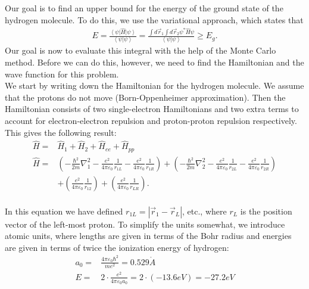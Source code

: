 Our goal is to find an upper bound for the energy of the ground state of the hydrogen molecule. To do this, we use the variational approach, which states that 
\begin{align}
E = \frac{{\left\langle \psi  \right|\hat H\left| \psi  \right\rangle }}{{\left\langle \psi  \right|\left. \psi  \right\rangle }} = \frac{{\int {d{{\vec r}_1}\int {d{{\vec r}_2}} {\psi ^ * }\hat H\psi } }}{{\left\langle \psi  \right|\left. \psi  \right\rangle }} \ge {E_g}.
\end{align}
Our goal is now to evaluate this integral with the help of the Monte Carlo method. Before we can do this, however, we need to find the Hamiltonian and the wave function for this problem.\\

We start by writing down the Hamiltonian for the hydrogen molecule. We assume that the protons do not move (Born-Oppenheimer approximation). Then the Hamiltonian consists of two single-electron Hamiltonians and two extra terms to account for electron-electron repulsion and proton-proton repulsion respectively. This gives the following result:
\begin{align}
\hat H =& {\hat H_1} + {\hat H_2} + {\hat H_{ee}} + {\hat H_{pp}}\\
\hat H =& \left( { - \frac{{{\hbar ^2}}}{{2m}}\nabla _1^2 - \frac{{{e^2}}}{{4\pi {\varepsilon _0}}}\frac{1}{{{r_{1L}}}} - \frac{{{e^2}}}{{4\pi {\varepsilon _0}}}\frac{1}{{{r_{1R}}}}} \right) + \left( { - \frac{{{\hbar ^2}}}{{2m}}\nabla _2^2 - \frac{{{e^2}}}{{4\pi {\varepsilon _0}}}\frac{1}{{{r_{2L}}}} - \frac{{{e^2}}}{{4\pi {\varepsilon _0}}}\frac{1}{{{r_{2R}}}}} \right)\nonumber\\
& + \left( {\frac{{{e^2}}}{{4\pi {\varepsilon _0}}}\frac{1}{{{r_{12}}}}} \right) + \left( {\frac{{{e^2}}}{{4\pi {\varepsilon _0}}}\frac{1}{{{r_{LR}}}}} \right).
\end{align}\\
In this equation we have defined ${r_{1L}} = \left| {{{\vec r}_1} - {{\vec r}_L}} \right|$, etc., where $r_L$ is the position vector of the left-most proton. To simplify the units somewhat, we introduce atomic units, where lengths are given in terms of the Bohr radius and energies are given in terms of twice the ionization energy of hydrogen:
\begin{align}
{a_0} =& \frac{{4\pi {\varepsilon _0}{\hbar ^2}}}{{m{e^2}}} = 0.529\mathring{A}\\
E =& 2 \cdot \frac{{{e^2}}}{{4\pi {\varepsilon _0}{a_0}}} = 2 \cdot \left( { - 13.6eV} \right) =  - 27.2eV
\end{align}\\
